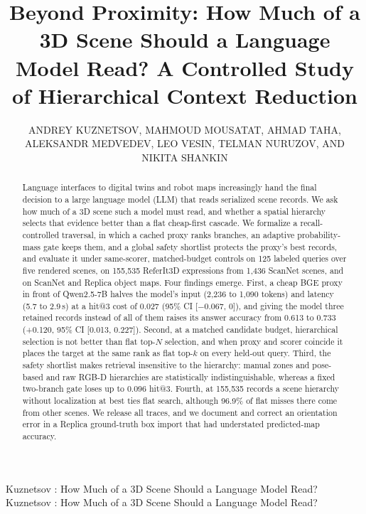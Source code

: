 \documentclass{ieeeaccess}
\begin{document}

\title{Beyond Proximity: How Much of a 3D Scene Should a Language Model Read?
A Controlled Study of Hierarchical Context Reduction}
\author{\uppercase{Andrey Kuznetsov},
\uppercase{Mahmoud Mousatat},
\uppercase{Ahmad Taha},
\uppercase{Aleksandr Medvedev},
\uppercase{Leo Vesin},
\uppercase{Telman Nuruzov}, AND
\uppercase{Nikita Shankin}}
\address[1]{Independent researchers, Beyond Proximity project
(e-mail: medvedguk@gmail.com)}
\markboth
{Kuznetsov \headeretal: How Much of a 3D Scene Should a Language Model Read?}
{Kuznetsov \headeretal: How Much of a 3D Scene Should a Language Model Read?}

\begin{abstract}
Language interfaces to digital twins and robot maps increasingly hand the final
decision to a large language model (LLM) that reads serialized scene records.
We ask how much of a 3D scene such a model must read, and whether a spatial
hierarchy selects that evidence better than a flat cheap-first cascade. We
formalize a recall-controlled traversal, in which a cached proxy ranks branches,
an adaptive probability-mass gate keeps them, and a global safety shortlist
protects the proxy's best records, and evaluate it under same-scorer,
matched-budget controls on 125 labeled queries over five rendered scenes, on
155,535 ReferIt3D expressions from 1,436 ScanNet scenes, and on ScanNet and
Replica object maps. Four findings emerge. First, a cheap BGE proxy in front of
Qwen2.5-7B halves the model's input (2,236 to 1,090 tokens) and latency (5.7 to
2.9\,s) at a hit@3 cost of 0.027 (95\% CI [$-0.067$, 0]), and giving the model three retained records instead of all of them raises its
answer accuracy from 0.613 to 0.733 (+0.120, 95\% CI [0.013, 0.227]). Second, at a matched candidate budget, hierarchical selection is
not better than flat top-$N$ selection, and when proxy and scorer coincide it
places the target at the same rank as flat top-$k$ on every held-out query. Third, the safety
shortlist makes retrieval insensitive to the hierarchy: manual zones and
pose-based and raw RGB-D hierarchies are statistically indistinguishable, whereas
a fixed two-branch gate loses up to 0.096 hit@3. Fourth, at 155,535 records a
scene hierarchy without localization at best ties flat search, although 96.9\%
of flat misses there come from other scenes. We release all traces, and we document and correct an orientation error in a
Replica ground-truth box import that had understated predicted-map accuracy.
\end{abstract}
\end{document}
